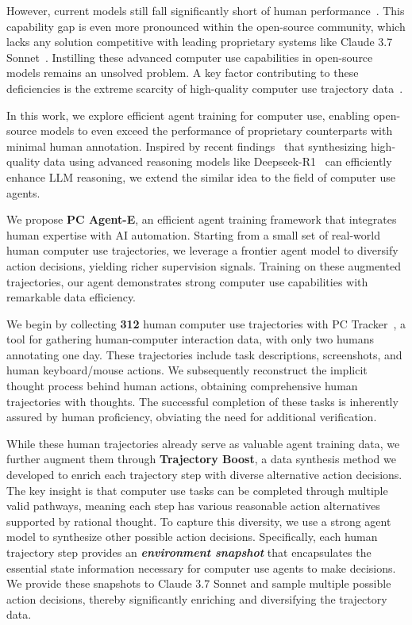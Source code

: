 \documentclass{article} %
\renewcommand{\cite}{\citep}
\begin{document}
However, current models still fall significantly short of human performance~\cite{xie2024osworldbenchmarkingmultimodalagents,bonatti2024windowsagentarenaevaluating}. This capability gap is even more pronounced within the open-source community, which lacks any solution competitive with leading proprietary systems like Claude 3.7 Sonnet~\cite{2025claude37}. Instilling these advanced computer use capabilities in open-source models remains an unsolved problem. A key factor contributing to these deficiencies is the extreme scarcity of high-quality computer use trajectory data~\cite{ou2024synatraturningindirectknowledge,xu2025agenttrekagenttrajectorysynthesis}.

In this work, we explore efficient agent training for computer use, enabling open-source models to even exceed the performance of proprietary counterparts with minimal human annotation. Inspired by recent findings~\cite{huang2024o1,muennighoff2025s1,ye2025limo} that synthesizing high-quality data using advanced reasoning models like Deepseek-R1~\cite{guo2025deepseek} can efficiently enhance LLM reasoning, we extend the similar idea to the field of computer use agents.



We propose \textbf{PC Agent-E}, an efficient agent training framework that integrates human expertise with AI automation. Starting from a small set of real-world human computer use trajectories, we leverage a frontier agent model to diversify action decisions, yielding richer supervision signals. Training on these augmented trajectories, our agent demonstrates strong computer use capabilities with remarkable data efficiency.



We begin by collecting \textbf{312} human computer use trajectories with PC Tracker~\cite{he2024pcagentsleepai}, a tool for gathering human-computer interaction data, with only two humans annotating one day. These trajectories include task descriptions, screenshots, and human keyboard/mouse actions. We subsequently reconstruct the implicit thought process behind human actions, obtaining comprehensive human trajectories with thoughts. The successful completion of these tasks is inherently assured by human proficiency, obviating the need for additional verification.

While these human trajectories already serve as valuable agent training data, we further augment them through \textbf{Trajectory Boost}, a data synthesis method we developed to enrich each trajectory step with diverse alternative action decisions. The key insight is that computer use tasks can be completed through multiple valid pathways, meaning each step has various reasonable action alternatives supported by rational thought. To capture this diversity, we use a strong agent model to synthesize other possible action decisions. 
Specifically, each human trajectory step provides an \textbf{\textit{environment snapshot}} that encapsulates the essential state information necessary for computer use agents to make decisions. We provide these snapshots to Claude 3.7 Sonnet and sample multiple possible action decisions, thereby significantly enriching and diversifying the trajectory data.
\end{document}
